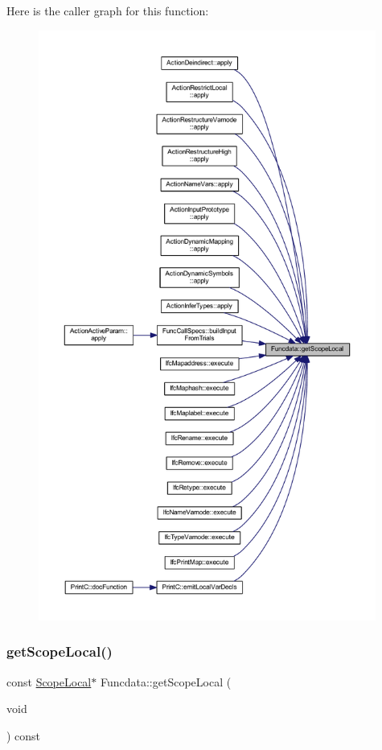 Here is the caller graph for this function\+:
\nopagebreak
\begin{figure}[H]
\begin{center}
\leavevmode
\includegraphics[height=550pt]{class_funcdata_aaa28789a086c52edd04c41e265818bbb_icgraph}
\end{center}
\end{figure}
\mbox{\label{class_funcdata_a119d29273d0e896ee16d7581f7548a80}} 
\subsubsection{\texorpdfstring{getScopeLocal()}{getScopeLocal()}\hspace{0.1cm}{\footnotesize\ttfamily [2/2]}}
{\footnotesize\ttfamily const \mbox{\hyperlink{class_scope_local}{Scope\+Local}}$\ast$ Funcdata\+::get\+Scope\+Local (\begin{DoxyParamCaption}\item[{void}]{ }\end{DoxyParamCaption}) const\hspace{0.3cm}{\ttfamily [inline]}}



